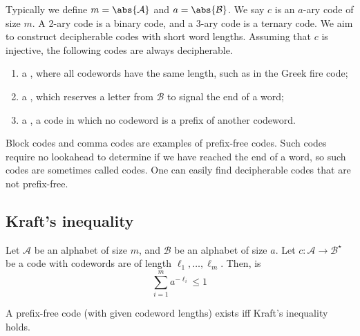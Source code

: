 Typically we define $m = \abs{\mathcal A}$ and $a = \abs{\mathcal B}$.
We say $c$ is an $a$-ary code of size $m$.
A 2-ary code is a binary code, and a 3-ary code is a ternary code.
We aim to construct decipherable codes with short word lengths.
Assuming that $c$ is injective, the following codes are always decipherable.
\begin{enumerate}
    \item a , where all codewords have the same length, such as in the Greek fire code;
    \item a , which reserves a letter from $\mathcal B$ to signal the end of a word;
    \item a , a code in which no codeword is a prefix of another codeword.
\end{enumerate}
Block codes and comma codes are examples of prefix-free codes.
Such codes require no lookahead to determine if we have reached the end of a word, so such codes are sometimes called  codes.
One can easily find decipherable codes that are not prefix-free.

\subsection{Kraft's inequality}

\begin{definition}
    Let $\mathcal A$ be an alphabet of size $m$, and $\mathcal B$ be an alphabet of size $a$.
    Let $c \colon \mathcal A \to \mathcal B^\star$ be a code with codewords are of length $\ell_1, \dots, \ell_m$.
    Then,  is
    \[ \sum_{i=1}^m a^{-\ell_i} \leq 1 \]
\end{definition}

\begin{theorem}
    A prefix-free code (with given codeword lengths) exists iff Kraft's inequality holds.
\end{theorem}

